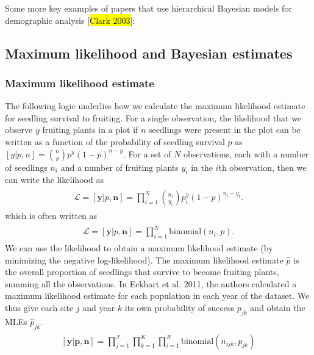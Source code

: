 \documentclass[12pt, oneside, titlepage]{article}   	%
\begin{document}
Some more key examples of papers that use hierarchical Bayesian models for demographic analysis [\hl{Clark 2003}]: \cite{evans2010}

\subsection*{Maximum likelihood and Bayesian estimates}
\subsubsection*{Maximum likelihood estimate}

The following logic underlies how we calculate the maximum likelihood estimate for seedling survival to fruiting. For a single observation, the likelihood that we observe $y$ fruiting plants in a plot if $n$ seedlings were present in the plot can be written as a function of the probability of seedling survival $p$ as $[y|p,n] = \binom{n}{y}p^y(1-p)^{n-y}$. For a set of $N$ observations, each with a number of seedlings $n_i$ and a number of fruiting plants $y_i$ in the $i$th observation, then we can write the likelihood as
%
\begin{align}
  \begin{split}
\mathcal{L} = [\bm{y}|p,\bm{n}]  = \prod_{i=1}^N \binom{n_i}{y_i}p^y_i(1-p)^{n_i-y_i}.
  \end{split}
\end{align}
%
which is often written as
%
\begin{align}
  \begin{split}
\mathcal{L} = [\bm{y}|p,\bm{n}]  = \prod_{i=1}^N \mathrm{binomial}(n_i,p).
  \end{split}
\end{align}
We can use the likelihood to obtain a maximum likelihood estimate (by minimizing the negative log-likelihood). The maximum likelihood estimate $\hat{p}$ is the overall proportion of seedlings that survive to become fruiting plants, summing all the observations. In Eckhart et al. 2011, the authors calculated a maximum likelihood estimate for each population in each year of the dataset. We thus give each site $j$ and year $k$ its own probability of success $p_{jk}$ and obtain the MLEs $\hat{p}_{jk}$.
%
\begin{align}
  \begin{split}
[\bm{y}|\bm{p},\bm{n}]  = \prod_{j=1}^J\prod_{k=1}^K\prod_{i=1}^N \mathrm{binomial}(n_{ijk},p_{jk}) \label{eq:frequentistMLE}
  \end{split}
\end{align}
\end{document}

